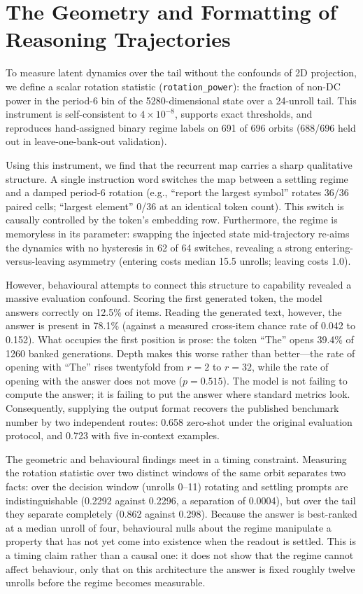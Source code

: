 \documentclass{article}
\begin{document}
\section*{The Geometry and Formatting of Reasoning Trajectories}

To measure latent dynamics over the tail without the confounds of 2D projection, we define a scalar rotation statistic (\texttt{rotation\_power}): the fraction of non-DC power in the period-6 bin of the 5280-dimensional state over a 24-unroll tail. This instrument is self-consistent to $4\times10^{-8}$, supports exact thresholds, and reproduces hand-assigned binary regime labels on 691 of 696 orbits (688/696 held out in leave-one-bank-out validation).

Using this instrument, we find that the recurrent map carries a sharp qualitative structure. A single instruction word switches the map between a settling regime and a damped period-6 rotation (e.g., ``report the largest symbol'' rotates 36/36 paired cells; ``largest element'' 0/36 at an identical token count). This switch is causally controlled by the token's embedding row. Furthermore, the regime is memoryless in its parameter: swapping the injected state mid-trajectory re-aims the dynamics with no hysteresis in 62 of 64 switches, revealing a strong entering-versus-leaving asymmetry (entering costs median 15.5 unrolls; leaving costs 1.0).

However, behavioural attempts to connect this structure to capability revealed a massive evaluation confound. Scoring the first generated token, the model answers correctly on 12.5\% of items. Reading the generated text, however, the answer is present in 78.1\% (against a measured cross-item chance rate of 0.042 to 0.152). What occupies the first position is prose: the token ``The'' opens 39.4\% of 1260 banked generations. Depth makes this worse rather than better---the rate of opening with ``The'' rises twentyfold from $r = 2$ to $r = 32$, while the rate of opening with the answer does not move ($p = 0.515$). The model is not failing to compute the answer; it is failing to put the answer where standard metrics look. Consequently, supplying the output format recovers the published benchmark number by two independent routes: 0.658 zero-shot under the original evaluation protocol, and 0.723 with five in-context examples.

The geometric and behavioural findings meet in a timing constraint. Measuring the rotation statistic over two distinct windows of the same orbit separates two facts: over the decision window (unrolls 0--11) rotating and settling prompts are indistinguishable (0.2292 against 0.2296, a separation of 0.0004), but over the tail they separate completely (0.862 against 0.298). Because the answer is best-ranked at a median unroll of four, behavioural nulls about the regime manipulate a property that has not yet come into existence when the readout is settled. This is a timing claim rather than a causal one: it does not show that the regime cannot affect behaviour, only that on this architecture the answer is fixed roughly twelve unrolls before the regime becomes measurable.
\end{document}
